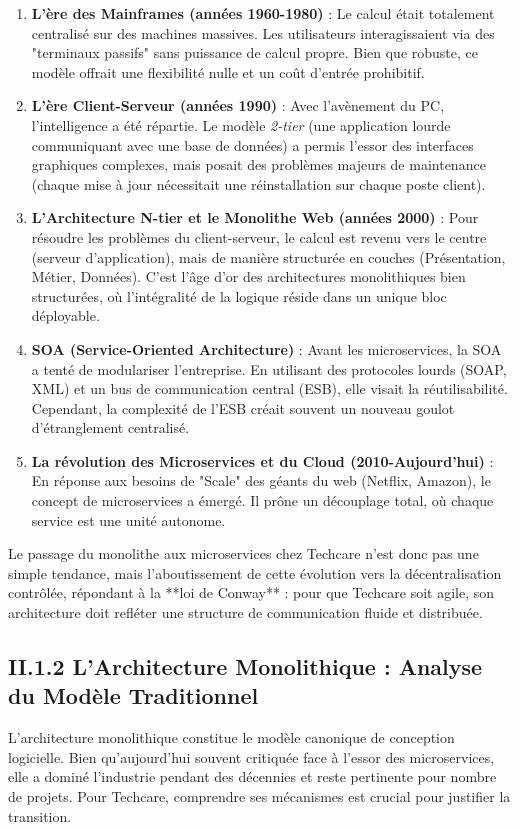 \begin{enumerate}
    \item \textbf{L'ère des Mainframes (années 1960-1980)} : Le calcul était totalement centralisé sur des machines massives. Les utilisateurs interagissaient via des "terminaux passifs" sans puissance de calcul propre. Bien que robuste, ce modèle offrait une flexibilité nulle et un coût d'entrée prohibitif.
    
    \item \textbf{L'ère Client-Serveur (années 1990)} : Avec l'avènement du PC, l'intelligence a été répartie. Le modèle \textit{2-tier} (une application lourde communiquant avec une base de données) a permis l'essor des interfaces graphiques complexes, mais posait des problèmes majeurs de maintenance (chaque mise à jour nécessitait une réinstallation sur chaque poste client).
    
    \item \textbf{L'Architecture N-tier et le Monolithe Web (années 2000)} : Pour résoudre les problèmes du client-serveur, le calcul est revenu vers le centre (serveur d'application), mais de manière structurée en couches (Présentation, Métier, Données). C'est l'âge d'or des architectures monolithiques bien structurées, où l'intégralité de la logique réside dans un unique bloc déployable.
    
    \item \textbf{SOA (Service-Oriented Architecture)} : Avant les microservices, la SOA a tenté de modulariser l'entreprise. En utilisant des protocoles lourds (SOAP, XML) et un bus de communication central (ESB), elle visait la réutilisabilité. Cependant, la complexité de l'ESB créait souvent un nouveau goulot d'étranglement centralisé.
    
    \item \textbf{La révolution des Microservices et du Cloud (2010-Aujourd'hui)} : En réponse aux besoins de "Scale" des géants du web (Netflix, Amazon), le concept de microservices a émergé. Il prône un découplage total, où chaque service est une unité autonome.
\end{enumerate}

Le passage du monolithe aux microservices chez Techcare n'est donc pas une simple tendance, mais l'aboutissement de cette évolution vers la décentralisation contrôlée, répondant à la **loi de Conway** : pour que Techcare soit agile, son architecture doit refléter une structure de communication fluide et distribuée.


\subsection{II.1.2 L'Architecture Monolithique : Analyse du Modèle Traditionnel}
L'architecture monolithique constitue le modèle canonique de conception logicielle. Bien qu'aujourd'hui souvent critiquée face à l'essor des microservices, elle a dominé l'industrie pendant des décennies et reste pertinente pour nombre de projets. Pour Techcare, comprendre ses mécanismes est crucial pour justifier la transition.

